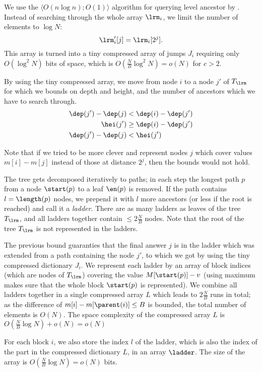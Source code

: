 \bigbreak

We use the $\langle O(n \log n); O(1) \rangle$ algorithm for querying level ancestor by \cite{bender2004level}.
Instead of searching through the whole array $\lrm_i$, we limit the number of elements to $\log N$:
$$ \lrm'_i[j] = \lrm_i[2^j]. $$
This array is turned into a tiny compressed array of jumps $J_i$ requiring only $O(\log^2 N)$ bits of space, which is $O(\frac{N}{B} \log^2 N) = o(N)$ for $c > 2$.

By using the tiny compressed array, we move from node $i$ to a node $j'$ of $T_{\lrm}$ for which we bounds on depth and height, and the number of ancestors which we have to search through.
\begin{align*}
	\dep(j') - \dep(j) &< \dep(i) - \dep(j') \\
	\hei(j') &\ge \dep(i) - \dep(j') \\
	\dep(j') - \dep(j) &< \hei(j')
\end{align*}

Note that if we tried to be more clever and represent nodes $j$ which cover values $m[i] - m[j]$ instead of those at distance $2^j$, then the bounds would not hold.

\bigbreak

The tree gets decomposed iteratively to paths; in each step the longest path $p$ from a node $\start(p)$ to a leaf $\en(p)$ is removed.
If the path contains $l = \length(p)$ nodes, we prepend it with $l$ more ancestors (or less if the root is reached) and call it a \emph{ladder}.
There are as many ladders as leaves of the tree $T_{\lrm}$, and all ladders together contain $\le 2 \frac{N}{B}$ nodes.
Note that the root of the tree $T_{\lrm}$ is not represented in the ladders.

The previous bound guaranties that the final answer $j$ is in the ladder which was extended from a path containing the node $j'$, to which we got by using the tiny compressed dictionary $J_i$.
We represent each ladder by an array of block indices (which are nodes of $T_{\lrm}$) covering the value $M[\start(p)] - v$ (using maximum makes sure that the whole block $\start(p)$ is represented).
We combine all ladders together in a single compressed array $L$ which leads to $2 \frac{N}{B}$ runs in total; as the difference of $m[i] - m[\parent(i)] \le B$ is bounded, the total number of elements is $O(N)$.
The space complexity of the compressed array $L$ is $O(\frac{N}{B} \log N) + o(N) = o(N)$

For each block $i$, we also store the index $l$ of the ladder, which is also the index of the part in the compressed dictionary $L$, in an array $\ladder$.
The size of the array is $O(\frac{N}{B} \log N) = o(N)$ bits.

